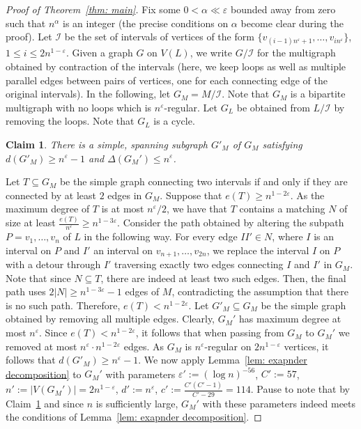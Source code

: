 \documentclass[11pt,reqno]{article}
\newtheorem{claim}[theorem]{Claim}
\newenvironment{claimproof}[1][\proofname]{\proof[#1]\renewcommand{\qedsymbol}{$\blacksquare$}}{\endproof}
\begin{document}
\begin{proof}[Proof of Theorem~\ref{thm: main}]
  Fix some $0<\alpha\ll\varepsilon$ bounded away from zero such that $n^\alpha$ is an integer (the precise conditions on $\alpha$ become clear during the proof). Let $\mathcal I$ be the set of intervals of vertices of the form $\{v_{(i-1)n^\varepsilon+1},\ldots,v_{in^\varepsilon}\}$, $1\leq i\leq 2n^{1-\varepsilon}$. Given a graph $G$ on $V(L)$, we write $G\slash\mathcal I$ for the multigraph obtained by contraction of the intervals (here, we keep loops as well as multiple parallel edges between pairs of vertices, one for each connecting edge of the original intervals). In the following, let $G_M=M\slash\mathcal I$. Note that $G_M$ is a bipartite multigraph with no loops which is $n^{\varepsilon}$-regular. Let $G_L$ be obtained from $L\slash\mathcal I$ by removing the loops. Note that $G_L$ is a cycle.
  \begin{claim}\label{clm:simple}
      There is a simple, spanning subgraph $G'_M$ of $G_M$ satisfying $d(G'_M)\geq n^{\varepsilon}-1$ and $\Delta(G_M')\le n^\varepsilon$.
  \end{claim}
  \begin{claimproof}
      Let $T\subseteq G_M$ be the simple graph connecting two intervals if and only if they are connected by at least $2$ edges in $G_M$. Suppose that $e(T)\geq n^{1-2\varepsilon}$. As the maximum degree of $T$ is at most $n^\varepsilon/2$, we have that $T$ contains a matching $N$ of size at least $\frac{e(T)}{n^{\varepsilon}}\geq n^{1-3\varepsilon}$. Consider the path obtained by altering the subpath $P=v_1,\ldots,v_n$ of $L$ in the following way. For every edge $II'\in N$, where $I$ is an interval on $P$ and $I'$ an interval on $v_{n+1},\ldots, v_{2n}$, we replace the interval $I$ on $P$ with a detour through $I'$ traversing exactly two edges connecting $I$ and $I'$ in $G_M$. Note that since $N\subseteq T$, there are indeed at least two such edges. Then, the final path uses $2|N|\geq n^{1-3\varepsilon}-1$ edges of $M$, contradicting the assumption that there is no such path. Therefore, $e(T)<n^{1-2\varepsilon}$. Let $G'_M\subseteq G_M$ be the simple graph obtained by removing all multiple edges. Clearly, $G_M'$ has maximum degree at most $n^\varepsilon$. Since $e(T)<n^{1-2\varepsilon}$, it follows that when passing from $G_M$ to $G_M'$ we removed at most $n^\varepsilon\cdot n^{1-2\varepsilon}$ edges. As $G_M$ is $n^\varepsilon$-regular on $2n^{1-\varepsilon}$ vertices, it follows that $d(G'_M)\geq n^\varepsilon-1$.
  \end{claimproof}
  We now apply Lemma~\ref{lem: exapnder decomposition} to $G_M'$ with parameters $\varepsilon':=(\log n)^{-56}$, $C':=57$, $n':=|V(G_M')|=2n^{1-\varepsilon}$, $d':=n^\varepsilon$, $c':=\frac{C'(C'-1)}{C'-29}=114$. Pause to note that by Claim~\ref{clm:simple} and since $n$ is sufficiently large, $G_M'$ with these parameters indeed meets the conditions of Lemma~\ref{lem: exapnder decomposition}.

\end{proof}
\end{document}
